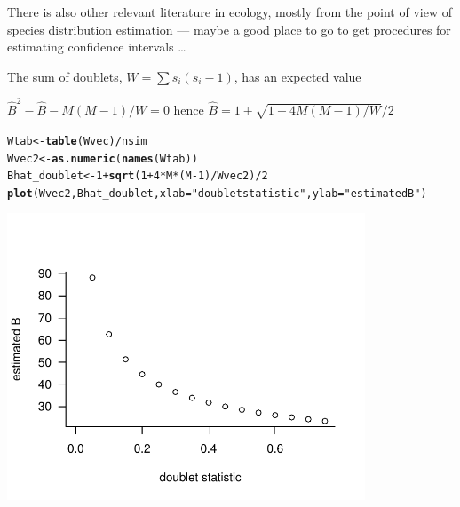 \documentclass{article}\usepackage[]{graphicx}\usepackage[]{color}
\makeatletter
\newcommand{\hlnum}[1]{\textcolor[rgb]{0.686,0.059,0.569}{#1}}%
\newcommand{\hlstr}[1]{\textcolor[rgb]{0.192,0.494,0.8}{#1}}%
\newcommand{\hlopt}[1]{\textcolor[rgb]{0,0,0}{#1}}%
\newcommand{\hlstd}[1]{\textcolor[rgb]{0.345,0.345,0.345}{#1}}%
\newcommand{\hlkwb}[1]{\textcolor[rgb]{0.69,0.353,0.396}{#1}}%
\newcommand{\hlkwc}[1]{\textcolor[rgb]{0.333,0.667,0.333}{#1}}%
\newcommand{\hlkwd}[1]{\textcolor[rgb]{0.737,0.353,0.396}{\textbf{#1}}}%
\newenvironment{kframe}{%
 \def\at@end@of@kframe{}%
 \ifinner\ifhmode%
  \def\at@end@of@kframe{\end{minipage}}%
  \begin{minipage}{\columnwidth}%
 \fi\fi%
 \def\FrameCommand##1{\hskip\@totalleftmargin \hskip-\fboxsep
 \colorbox{shadecolor}{##1}\hskip-\fboxsep
     \hskip-\linewidth \hskip-\@totalleftmargin \hskip\columnwidth}%
 \MakeFramed {\advance\hsize-\width
   \@totalleftmargin\z@ \linewidth\hsize
   \@setminipage}}%
 {\par\unskip\endMakeFramed%
 \at@end@of@kframe}
\newenvironment{knitrout}{}{} %
\makeatother
\begin{document}
There is also other relevant literature in ecology, mostly from
the point of view of species distribution estimation
\citep{good_population_1953,chao_estimating_1992} --- maybe
a good place to go to get procedures for estimating confidence
intervals \ldots

The sum of doublets, $W=\sum s_i (s_i-1)$, has an
expected value

$\hat B^2 - \hat B - M(M-1)/W = 0$
hence $\hat B = 1 \pm \sqrt{1+4 M(M-1)/W}/2$
\begin{knitrout}
\color{fgcolor}\begin{kframe}
\begin{alltt}
\hlstd{Wtab} \hlkwb{<-} \hlkwd{table}\hlstd{(Wvec)}\hlopt{/}\hlstd{nsim}
\hlstd{Wvec2} \hlkwb{<-} \hlkwd{as.numeric}\hlstd{(}\hlkwd{names}\hlstd{(Wtab))}
\hlstd{Bhat_doublet} \hlkwb{<-} \hlnum{1} \hlopt{+} \hlkwd{sqrt}\hlstd{(}\hlnum{1}\hlopt{+}\hlnum{4}\hlopt{*}\hlstd{M}\hlopt{*}\hlstd{(M}\hlopt{-}\hlnum{1}\hlstd{)}\hlopt{/}\hlstd{Wvec2)}\hlopt{/}\hlnum{2}
\hlkwd{plot}\hlstd{(Wvec2,Bhat_doublet,}\hlkwc{xlab}\hlstd{=}\hlstr{"doublet statistic"}\hlstd{,}\hlkwc{ylab}\hlstd{=}\hlstr{"estimated B"}\hlstd{)}
\end{alltt}
\end{kframe}
\includegraphics[width=0.8\textwidth]{figure/unnamed-chunk-2-1} 

\end{knitrout}
\end{document}
